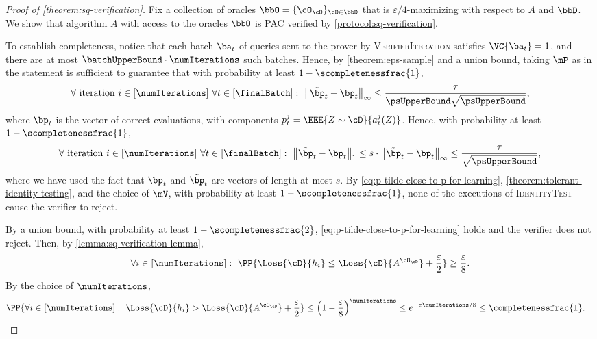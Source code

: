 \documentclass{toc}
\begin{document}
\begin{proof}[Proof of \cref{theorem:sq-verification}]
	Fix a collection of oracles $\bbO = \{\cO_\cD\}_{\cD \in \bbD}$ that is $\varepsilon/4$-maximizing with respect to $A$ and $\bbD$.
	We show that algorithm $A$ with access to the oracles $\bbO$ is PAC verified by \cref{protocol:sq-verification}.
	
	To establish completeness, notice that each batch $\ba_t$ of queries sent to the prover by \textsc{VerifierIteration} satisfies $\VC{\ba_t} = 1$, and there are at most $\batchUpperBound \cdot \numIterations$ such batches. Hence, by \cref{theorem:eps-sample} and a union bound, taking $\mP$ as in the statement is sufficient to guarantee that with probability at least $1-\scompletenessfrac{1}$, 
	\[
		\forall \text{ iteration } i \in [\numIterations] ~ \forall t \in [\finalBatch]: ~  \left\|\tilde{\bp}_t  - \bp_t\right\|_\infty \leq \frac{\tau}{\psUpperBound\sqrt{\psUpperBound}},
	\]
	where $\bp_t$ is the vector of correct evaluations, with components $p_t^j = \EEE{Z \sim \cD}{a_t^j(Z)}$. Hence, with probability at least $1-\scompletenessfrac{1}$,
	\begin{equation}\label{eq:p-tilde-close-to-p-for-learning}
		\forall \text{ iteration } i \in [\numIterations] ~ \forall t \in [\finalBatch]: ~  \left\|\tilde{\bp}_t  - \bp_t\right\|_1
		\leq 
		s \cdot \left\|\tilde{\bp}_t  - \bp_t\right\|_\infty
		\leq 
		\frac{\tau}{\sqrt{\psUpperBound}},
	\end{equation}
	where we have used the fact that $\bp_t$ and $\tilde{\bp}_t$ are vectors of length at most $s$. 
	By \cref{eq:p-tilde-close-to-p-for-learning}, \cref{theorem:tolerant-identity-testing}, and the choice of $\mV$, with probability at least $1-\scompletenessfrac{1}$, none of the executions of \textsc{IdentityTest} cause the verifier to reject.
	
	By a union bound, with probability at least $1-\scompletenessfrac{2}$, \cref{eq:p-tilde-close-to-p-for-learning} holds and the verifier does not reject. Then, by \cref{lemma:sq-verification-lemma}, 
	\begin{equation}\label{eq:h-is-good-with-pr-eps}
		\forall i \in [\numIterations]: ~ \PP{\Loss{\cD}{h_i} \leq \Loss{\cD}{A^{\cO_\cD}} + \frac{\varepsilon}{2}} \geq \frac{\varepsilon}{8}.
	\end{equation}
	By the choice of $\numIterations$,
	\begin{align}\label{eq:exists-good-h}
		\PP{\forall i \in [\numIterations]: ~ \Loss{\cD}{h_i} > \Loss{\cD}{A^{\cO_\cD}} + \frac{\varepsilon}{2}} &\leq \left(1-\frac{\varepsilon}{8}\right)^\numIterations \leq e^{-\varepsilon\numIterations/8} \leq \completenessfrac{1}.
	\end{align}
	

\end{proof}
\end{document}
